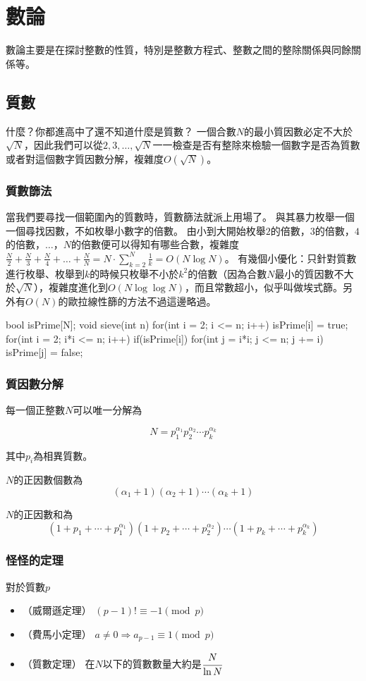 \chapter{數論 \uppercase\expandafter{}}
數論主要是在探討整數的性質，特別是整數方程式、整數之間的整除關係與同餘關係等。

\section{質數}
什麼？你都進高中了還不知道什麼是質數？
一個合數$N$的最小質因數必定不大於$\sqrt{N}$，因此我們可以從$2,3,\dots,\sqrt{N}$一一檢查是否有整除來檢驗一個數字是否為質數或者對這個數字質因數分解，複雜度$O(\sqrt{N})$。

\subsection{質數篩法}
當我們要尋找一個範圍內的質數時，質數篩法就派上用場了。
與其暴力枚舉一個一個尋找因數，不如枚舉小數字的倍數。
由小到大開始枚舉$2$的倍數，$3$的倍數，$4$的倍數，$\dots$，$N$的倍數便可以得知有哪些合數，複雜度$\frac{N}{2}+\frac{N}{3}+\frac{N}{4}+\dots+\frac{N}{N} = N \cdot \sum_{k=2}^N \frac{1}{k} = O(N\log N)$。
有幾個小優化：只針對質數進行枚舉、枚舉到$k$的時候只枚舉不小於$k^2$的倍數（因為合數$N$最小的質因數不大於$\sqrt{N}$），複雜度進化到$O(N \log \log N)$，而且常數超小，似乎叫做埃式篩。另外有$O(N)$的歐拉線性篩的方法不過這邊略過。
\begin{C++}
bool isPrime[N];
void sieve(int n) {
	for(int i = 2; i <= n; i++) isPrime[i] = true;
	for(int i = 2; i*i <= n; i++) if(isPrime[i]) {
		for(int j = i*i; j <= n; j += i) {
			isPrime[j] = false;
		}
	}
}
\end{C++}

\subsection{質因數分解}
每一個正整數$N$可以唯一分解為

$$
N = p_1^{\alpha_1}p_2^{\alpha_2}\cdots p_k^{\alpha_k}
$$

其中$p_i$為相異質數。

$N$的正因數個數為
$$(\alpha_1+1)(\alpha_2+1)\cdots(\alpha_k+1)$$

$N$的正因數和為
$$(1+p_1+\cdots+p_1^{\alpha_1})(1+p_2+\cdots+p_2^{\alpha_2}) \cdots (1+p_k+\cdots+p_k^{\alpha_k})$$

\subsection{怪怪的定理}
對於質數$p$
\begin{itemize}
\item （威爾遜定理） $(p-1)! \equiv -1 \pmod p$
\item （費馬小定理） $a \neq 0 \Rightarrow a_{p-1} \equiv 1 \pmod p$
\item （質數定理） 在$N$以下的質數數量大約是$\cfrac{N}{\ln N}$
\end{itemize}

